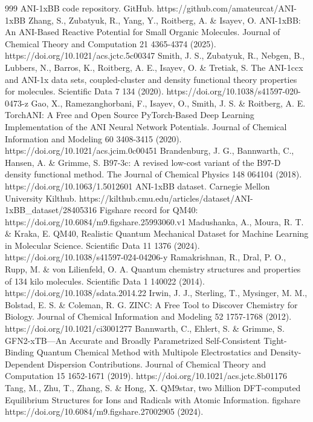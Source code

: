 \documentclass[12pt]{article}
\begin{document}
\begin{thebibliography}{999}
 ANI-1xBB code repository. GitHub. https://github.com/amateurcat/ANI-1xBB
 Zhang, S., Zubatyuk, R., Yang, Y., Roitberg, A. \& Isayev, O. ANI-1xBB: An ANI-Based Reactive Potential for Small Organic Molecules. Journal of Chemical Theory and Computation 21 4365-4374 (2025). https://doi.org/10.1021/acs.jctc.5c00347
 Smith, J. S., Zubatyuk, R., Nebgen, B., Lubbers, N., Barros, K., Roitberg, A. E., Isayev, O. \& Tretiak, S. The ANI-1ccx and ANI-1x data sets, coupled-cluster and density functional theory properties for molecules. Scientific Data 7 134 (2020). https://doi.org/10.1038/s41597-020-0473-z
 Gao, X., Ramezanghorbani, F., Isayev, O., Smith, J. S. \& Roitberg, A. E. TorchANI: A Free and Open Source PyTorch-Based Deep Learning Implementation of the ANI Neural Network Potentials. Journal of Chemical Information and Modeling 60 3408-3415 (2020). https://doi.org/10.1021/acs.jcim.0c00451
 Brandenburg, J. G., Bannwarth, C., Hansen, A. \& Grimme, S. B97-3c: A revised low-cost variant of the B97-D density functional method. The Journal of Chemical Physics 148 064104 (2018). https://doi.org/10.1063/1.5012601
 ANI-1xBB dataset. Carnegie Mellon University Kilthub. https://kilthub.cmu.edu/articles/dataset/ANI-1xBB\_dataset/28405316
 Figshare record for QM40: https://doi.org/10.6084/m9.figshare.25993060.v1
 Madushanka, A., Moura, R. T. \& Kraka, E. QM40, Realistic Quantum Mechanical Dataset for Machine Learning in Molecular Science. Scientific Data 11 1376 (2024). https://doi.org/10.1038/s41597-024-04206-y
 Ramakrishnan, R., Dral, P. O., Rupp, M. \& von Lilienfeld, O. A. Quantum chemistry structures and properties of 134 kilo molecules. Scientific Data 1 140022 (2014). https://doi.org/10.1038/sdata.2014.22
 Irwin, J. J., Sterling, T., Mysinger, M. M., Bolstad, E. S. \& Coleman, R. G. ZINC: A Free Tool to Discover Chemistry for Biology. Journal of Chemical Information and Modeling 52 1757-1768 (2012). https://doi.org/10.1021/ci3001277
 Bannwarth, C., Ehlert, S. \& Grimme, S. GFN2-xTB—An Accurate and Broadly Parametrized Self-Consistent Tight-Binding Quantum Chemical Method with Multipole Electrostatics and Density-Dependent Dispersion Contributions. Journal of Chemical Theory and Computation 15 1652-1671 (2019). https://doi.org/10.1021/acs.jctc.8b01176
 Tang, M., Zhu, T., Zhang, S. \& Hong, X. QM9star, two Million DFT-computed Equilibrium Structures for Ions and Radicals with Atomic Information. figshare https://doi.org/10.6084/m9.figshare.27002905 (2024).

\end{thebibliography}
\end{document}
